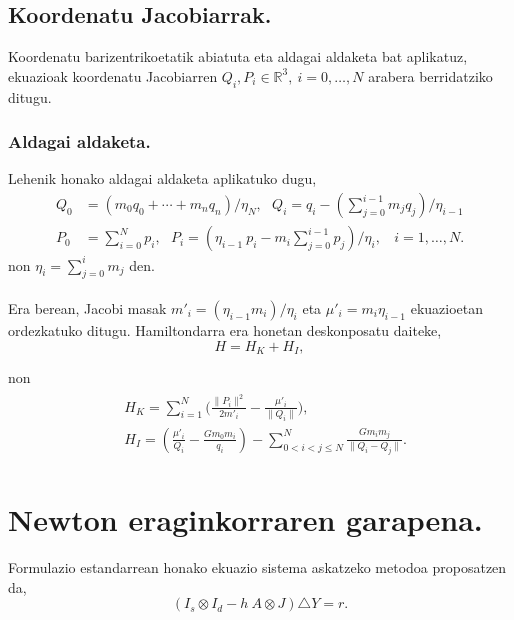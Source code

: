 \subsection*{Koordenatu Jacobiarrak.}

Koordenatu barizentrikoetatik abiatuta eta aldagai aldaketa bat aplikatuz, ekuazioak koordenatu Jacobiarren  $Q_i,P_i \in \mathbb{R}^3, \ i=0,\dots,N$ arabera berridatziko ditugu. 

\subsubsection*{Aldagai aldaketa.}
Lehenik honako aldagai aldaketa aplikatuko dugu,
\begin{align*}
Q_0 &=(m_0 q_0+\cdots+m_n q_n)/\eta_N,\ \ \ Q_i  =q_i-\left(\sum_{j=0}^{i-1}m_j q_j \right)/\eta_{i-1} \\
P_0 &=\sum\limits_{i=0}^{N}p_i, \ \ \ P_i =\left(\eta_{i-1} \ p_i- m_i \sum_{j=0}^{i-1} p_j\right)/\eta_i, \ \ \ \ i=1,\dots{,N}.
\end{align*}
non $\eta_i=\sum_{j=0}^{i} m_j$ den.

\paragraph*{}Era berean, Jacobi masak $m'_i=(\eta_{i-1} m_i)/\eta_i$ eta $\mu'_i=m_i \eta_{i-1}$ ekuazioetan ordezkatuko ditugu. Hamiltondarra era honetan deskonposatu daiteke,
\begin{equation*}
H=H_K+H_I,
\end{equation*} 

non
\begin{align*}
\begin{split}
&H_K=\sum\limits_{i=1}^{N}\bigg(\frac{\|P_i\|^2}{2 m'_i} -\frac{\mu'_i}{\|Q_i\|}\bigg), \\
&H_I=\left(\frac{\mu'_i}{Q_i}-\frac{Gm_0m_i}{q_i} \right) -\sum\limits_{0< i<j\le N}^{N} \frac{G m_i m_j}{\|Q_i-Q_j\|}.
\end{split}
\end{align*}

\section{Newton eraginkorraren garapena.}
\label{erans:A3}

Formulazio estandarrean honako ekuazio sistema askatzeko metodoa proposatzen da,
\begin{equation}
\label{eqA3:1}
(I_s \otimes I_d- h \ A \otimes J) \triangle Y =r.
\end{equation}

